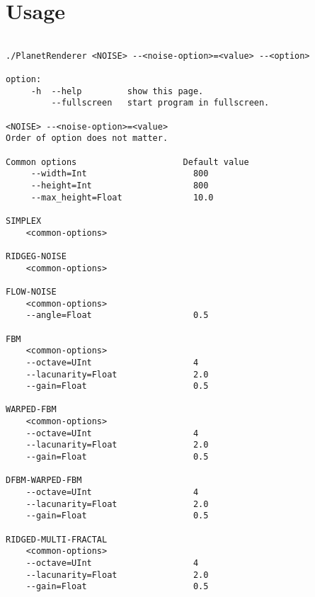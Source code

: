 \section*{Usage}

\begin{center}
\lstset{language=sh}
\begin{lstlisting}[basicstyle=\small]

./PlanetRenderer <NOISE> --<noise-option>=<value> --<option>

option:
	 -h  --help         show this page.
 	     --fullscreen   start program in fullscreen.
 	
<NOISE> --<noise-option>=<value>
Order of option does not matter.

Common options                     Default value
	 --width=Int                     800
	 --height=Int                    800
	 --max_height=Float              10.0

SIMPLEX
	<common-options>

RIDGEG-NOISE
	<common-options>

FLOW-NOISE
	<common-options>
	--angle=Float                    0.5

FBM
	<common-options> 
	--octave=UInt                    4
	--lacunarity=Float               2.0 
	--gain=Float                     0.5

WARPED-FBM 
	<common-options> 
	--octave=UInt                    4
	--lacunarity=Float               2.0
	--gain=Float                     0.5

DFBM-WARPED-FBM 
	--octave=UInt                    4
	--lacunarity=Float               2.0
	--gain=Float                     0.5

RIDGED-MULTI-FRACTAL 
	<common-options> 
	--octave=UInt                    4
	--lacunarity=Float               2.0
	--gain=Float                     0.5

\end{lstlisting}
\end{center}